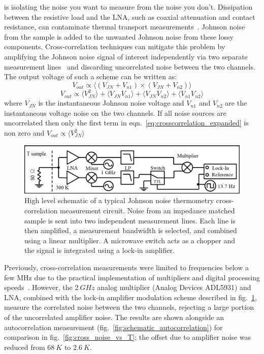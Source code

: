  is isolating the noise you want to measure from the noise you don't. Dissipation between the resistive load and the LNA, such as coaxial attenuation and contact resistance, can contaminate thermal transport measurements~\cite{white_status_1996, Glattli:1997}. Johnson noise from the sample is added to the unwanted Johnson noise from these lossy components. Cross-correlation techniques can mitigate this problem by amplifying the Johnson noise signal of interest independently via two separate measurement lines~\cite{Glattli:1997p7350, DiCarlo:2006p2620, Henny:1999p2790, Brophy:1965p2623, *Klein:1978p2616} and discarding uncorrelated noise between the two channels. The output voltage of such a scheme can be written as:
\begin{equation}
V_{out}\propto\langle\left(V_{JN}+V_{n1}\right)\times\left(V_{JN}+V_{n2}\right)\rangle 
\end{equation}
\begin{equation}\label{eq:crosscorrelation_expanded}
V_{out}\propto\langle V_{JN}^2\rangle + \langle V_{JN}V_{n1}\rangle+\langle V_{JN}V_{n2}\rangle+\langle V_{n1}V_{n2}\rangle
\end{equation}
where $V_{JN}$ is the instantaneous Johnson noise voltage and $V_{n1}$ and $V_{n2}$ are the instantaneous voltage noise on the two channels. If all noise sources are uncorrelated then only the first term in eqn.~\ref{eq:crosscorrelation_expanded} is non zero and ${V_{out}\propto\langle V_{JN}^2\rangle}$
\begin{figure}
\centering
\includegraphics[width=\textwidth]{figures/Johnson_noise_thermometry/Schematic_Crosscorrelation.png}
\caption[JNT crosscorrelation schematic]{High level schematic of a typical Johnson noise thermometry cross-correlation measurement circuit. Noise from an impedance matched sample is sent into two independent measurement lines. Each line is then amplified, a measurement bandwidth is selected, and combined using a linear multiplier. A microwave switch acts as a chopper and the signal is integrated using a lock-in amplifier.}
\label{fig:schematic_crosscorrelation}
\end{figure}
Previously, cross-correlation measurements were limited to frequencies below a few MHz due to the practical implementation of multipliers and digital processing speeds~\cite{Brophy:1965p2623, *Klein:1978p2616, Sampietro:2000p2679, DiCarlo:2006p2620}. However, the $2~GHz$ analog multiplier (Analog Devices ADL5931) and LNA, combined with the lock-in amplifier modulation scheme described in fig.~\ref{fig:schematic_crosscorrelation}, measure the correlated noise between the two channels, rejecting a large portion of the uncorrelated amplifier noise. The results are shown alongside an autocorrelation measurement (fig.~\ref{fig:schematic_autocorrelation}) for comparison in fig.~\ref{fig:cross_noise_vs_T}; the offset due to amplifier noise was reduced from $68~K$ to $2.6~K$.

